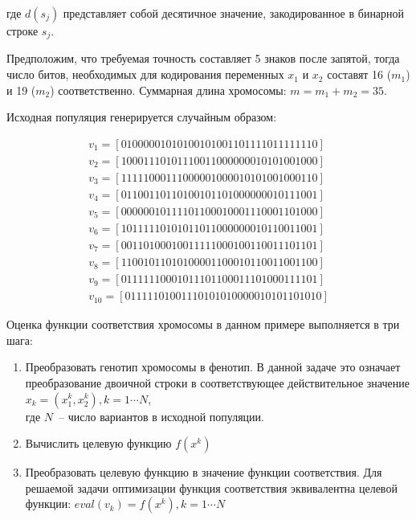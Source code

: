 где $d(s_j)$ представляет собой десятичное значение, закодированное в бинарной строке $s_j$.

Предположим, что требуемая точность составляет 5 знаков после запятой, тогда число битов,
необходимых для кодирования переменных $x_1$ и $x_2$ составят 16 ($m_1$) и 19 ($m_2$) соответственно.
Суммарная длина хромосомы: $m=m_1+m_2 = 35$.

Исходная популяция генерируется случайным образом:

\begin{equation*}
  \begin{array}{l}
  v_1 = [01000001010100101001101111011111110] \\
  v_2 = [10001110101110011000000010101001000] \\
  v_3 = [11111000111000001000010101001000110] \\
  v_4 = [01100110110100101101000000010111001] \\
  v_5 = [00000010111101100010001110001101000] \\
  v_6 = [10111110101011011000000010110011001] \\
  v_7 = [00110100010011111000100110011101101] \\
  v_8 = [11001011010100001100010110011001100] \\
  v_9 = [01111110001011101100011101000111101] \\
  v_{10} = [01111101001110101010000010101101010]
  \end{array}
\end{equation*}

Оценка функции соответствия хромосомы в данном примере выполняется в три шага:
\begin{enumerate}
  \item{Преобразовать генотип хромосомы в фенотип. В данной задаче это означает преобразование двоичной
    строки в соответствующее действительное значение $x_{k} = (x_{1}^{k}, x_{2}^{k}), k = 1 \cdots N$, \\
    где $N$~-- число вариантов в исходной популяции.}
  \item{Вычислить целевую функцию $f(x^k)$}
  \item{Преобразовать целевую функцию в значение функции соответствия. Для решаемой задачи оптимизации 
    функция соответствия эквивалентна целевой функции: $eval(v_k) = f(x^k), k = 1 \cdots N$}
\end{enumerate}

